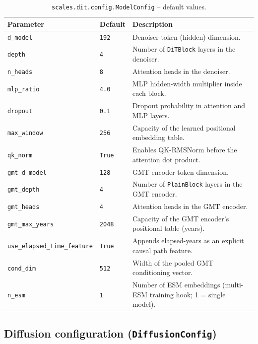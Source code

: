 \documentclass[11pt]{article}
\begin{document}
\begin{table}[h]
\centering
\caption{\texttt{scales.dit.config.ModelConfig} -- default values.}
\begin{tabular}{@{}llL{7cm}@{}}
\toprule
Parameter & Default & Description \\
\midrule
\texttt{d\_model}              & \texttt{192}  & Denoiser token (hidden) dimension. \\
\texttt{depth}                 & \texttt{4}    & Number of \texttt{DiTBlock} layers in the denoiser. \\
\texttt{n\_heads}               & \texttt{8}    & Attention heads in the denoiser. \\
\texttt{mlp\_ratio}             & \texttt{4.0}  & MLP hidden-width multiplier inside each block. \\
\texttt{dropout}                & \texttt{0.1}  & Dropout probability in attention and MLP layers. \\
\texttt{max\_window}            & \texttt{256}  & Capacity of the learned positional embedding table. \\
\texttt{qk\_norm}               & \texttt{True} & Enables QK-RMSNorm before the attention dot product. \\
\texttt{gmt\_d\_model}          & \texttt{128}  & GMT encoder token dimension. \\
\texttt{gmt\_depth}             & \texttt{4}    & Number of \texttt{PlainBlock} layers in the GMT encoder. \\
\texttt{gmt\_heads}             & \texttt{4}    & Attention heads in the GMT encoder. \\
\texttt{gmt\_max\_years}        & \texttt{2048} & Capacity of the GMT encoder's positional table (years). \\
\texttt{use\_elapsed\_time\_feature} & \texttt{True} & Appends elapsed-years as an explicit causal path feature. \\
\texttt{cond\_dim}              & \texttt{512}  & Width of the pooled GMT conditioning vector. \\
\texttt{n\_esm}                 & \texttt{1}    & Number of ESM embeddings (multi-ESM training hook; 1 = single model). \\
\bottomrule
\end{tabular}
\end{table}

\subsection{Diffusion configuration (\texttt{DiffusionConfig})}
\end{document}
